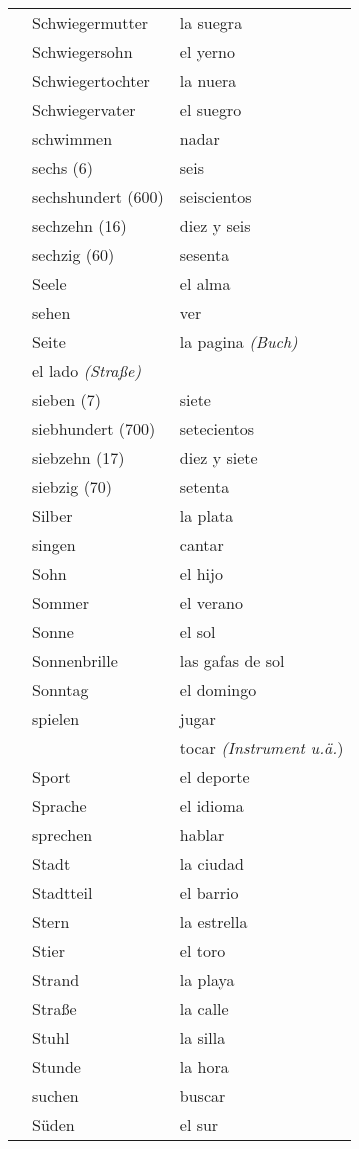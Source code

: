 \documentclass[10pt,spanish]{article}
\begin{document}
\begin{longtable}{p{} p{} | p{}}
& Schwiegermutter & la suegra  \\
& Schwiegersohn & el yerno  \\
& Schwiegertochter & la nuera  \\
& Schwiegervater & el suegro  \\
& schwimmen & nadar  \\
& sechs (6) & seis  \\
& sechshundert (600) & seiscientos   \\
& sechzehn (16) & diez y seis  \\
& sechzig (60) & sesenta  \\
& Seele & el alma  \\
& sehen & ver \\
& Seite & la pagina \textit{(Buch)} \\
& el lado \textit{(Straße)} \\
& sieben (7) & siete  \\
& siebhundert (700) & setecientos  \\
& siebzehn (17) & diez y siete  \\
& siebzig (70) & setenta  \\
& Silber & la plata  \\
& singen & cantar  \\
& Sohn & el hijo  \\
& Sommer & el verano  \\
& Sonne & el sol  \\
& Sonnenbrille & las gafas de sol \\
& Sonntag & el domingo  \\
& spielen & jugar  \\
& & tocar \textit{(Instrument u.ä.}) \\
& Sport & el deporte  \\
& Sprache & el idioma  \\
& sprechen & hablar  \\
& Stadt & la ciudad \\
& Stadtteil & el barrio  \\
& Stern & la estrella \\
& Stier & el toro  \\
& Strand & la playa  \\
& Straße & la calle  \\
& Stuhl & la silla  \\
& Stunde & la hora  \\
& suchen & buscar  \\
& Süden & el sur  \\

\end{longtable}
\end{document}
